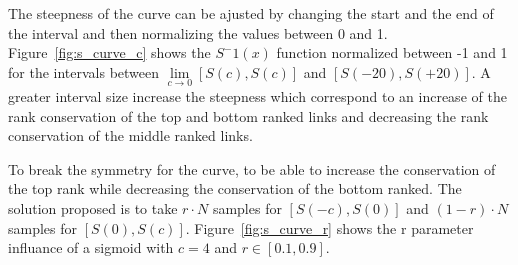 The steepness of the curve can be ajusted by changing the start and the end of the interval and then normalizing the values between 0 and 1.
Figure~\ref{fig:s_curve_c} shows the $S^-1(x)$ function normalized between -1 and 1 for the intervals between $\lim\limits_{c \rightarrow 0} \left[S(c), S(c)\right]$ and $\left[S(-20), S(+20)\right]$.
A greater interval size increase the steepness which correspond to an increase of the rank conservation of the top and bottom ranked links and decreasing the rank conservation of the middle ranked links.

To break the symmetry for the curve, to be able to increase the conservation of the top rank while decreasing the conservation of the bottom ranked.
The solution proposed is to take $r \cdot N$ samples for $\left[S(-c), S(0)\right]$ and $(1-r) \cdot N$ samples for $\left[S(0), S(c)\right]$.
Figure~\ref{fig:s_curve_r} shows the r parameter influance of a sigmoid with $c = 4$ and $r \in \left[0.1, 0.9\right]$.

